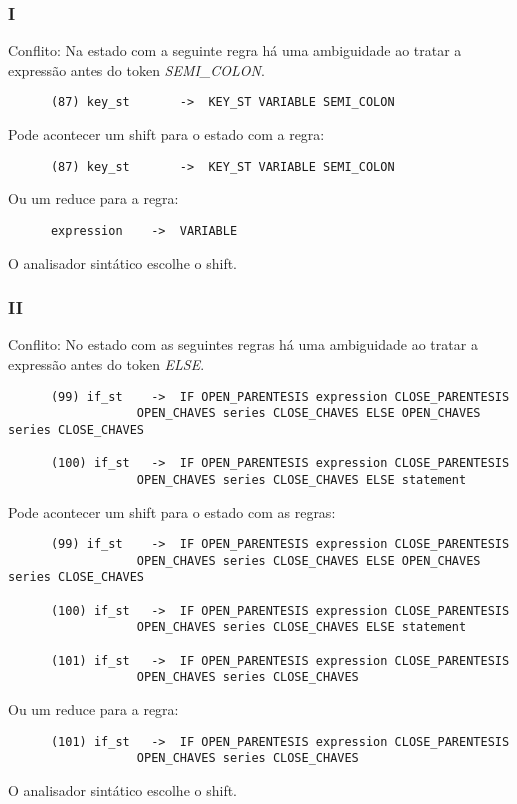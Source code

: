 \documentclass[a4paper,10pt]{article}
\begin{document}
    \subsubsection{I}
      Conflito: Na estado com a seguinte regra h\'a uma ambiguidade ao tratar a express\~ao antes do token \emph{SEMI\_COLON}.
      \begin{lstlisting}
      (87) key_st		->	KEY_ST VARIABLE SEMI_COLON
      \end{lstlisting}
      Pode acontecer um shift para o estado com a regra:
      \begin{lstlisting}
      (87) key_st		->	KEY_ST VARIABLE SEMI_COLON
      \end{lstlisting}
      Ou um reduce para a regra:
      \begin{lstlisting}
      expression	->	VARIABLE
      \end{lstlisting}
      O analisador sint\'atico escolhe o shift.
      \vspace{5mm}
      
    \subsubsection{II}
      Conflito: No estado com as seguintes regras h\'a uma ambiguidade ao tratar a express\~ao antes do token \emph{ELSE}.
      \begin{lstlisting}
      (99) if_st	->	IF OPEN_PARENTESIS expression CLOSE_PARENTESIS
				  OPEN_CHAVES series CLOSE_CHAVES ELSE OPEN_CHAVES series CLOSE_CHAVES
      
      (100) if_st	->	IF OPEN_PARENTESIS expression CLOSE_PARENTESIS
				  OPEN_CHAVES series CLOSE_CHAVES ELSE statement
      \end{lstlisting}
      Pode acontecer um shift para o estado com as regras:
      \begin{lstlisting}
      (99) if_st	->	IF OPEN_PARENTESIS expression CLOSE_PARENTESIS
				  OPEN_CHAVES series CLOSE_CHAVES ELSE OPEN_CHAVES series CLOSE_CHAVES
				  
      (100) if_st	->	IF OPEN_PARENTESIS expression CLOSE_PARENTESIS
				  OPEN_CHAVES series CLOSE_CHAVES ELSE statement
				  
      (101) if_st	->	IF OPEN_PARENTESIS expression CLOSE_PARENTESIS
				  OPEN_CHAVES series CLOSE_CHAVES
      \end{lstlisting}
      Ou um reduce para a regra:
      \begin{lstlisting}
      (101) if_st	->	IF OPEN_PARENTESIS expression CLOSE_PARENTESIS
				  OPEN_CHAVES series CLOSE_CHAVES
      \end{lstlisting}
      O analisador sint\'atico escolhe o shift.
      \vspace{5mm}
      
\end{document}
